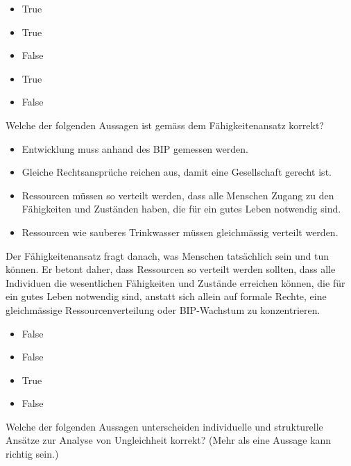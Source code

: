 \documentclass[
  nswissgerman,
  a4paper,
  DIV=11,
  numbers=noendperiod,
  oneside,
  openany]{scrreprt}
\providecommand{\tightlist}{%
  \setlength{\itemsep}{0pt}\setlength{\parskip}{0pt}}
\begin{document}
\begin{itemize}
\tightlist
\item
  True
\item
  True
\item
  False
\item
  True
\item
  False
\end{itemize}

Welche der folgenden Aussagen ist gemäss dem Fähigkeitenansatz korrekt?

\begin{itemize}
\tightlist
\item[$\square$]
  Entwicklung muss anhand des BIP gemessen werden.
\item[$\square$]
  Gleiche Rechtsansprüche reichen aus, damit eine Gesellschaft gerecht
  ist.
\item[$\square$]
  Ressourcen müssen so verteilt werden, dass alle Menschen Zugang zu den
  Fähigkeiten und Zuständen haben, die für ein gutes Leben notwendig
  sind.
\item[$\square$]
  Ressourcen wie sauberes Trinkwasser müssen gleichmässig verteilt
  werden.
\end{itemize}

Der Fähigkeitenansatz fragt danach, was Menschen tatsächlich sein und
tun können. Er betont daher, dass Ressourcen so verteilt werden sollten,
dass alle Individuen die wesentlichen Fähigkeiten und Zustände erreichen
können, die für ein gutes Leben notwendig sind, anstatt sich allein auf
formale Rechte, eine gleichmässige Ressourcenverteilung oder
BIP-Wachstum zu konzentrieren.

\begin{itemize}
\tightlist
\item
  False
\item
  False
\item
  True
\item
  False
\end{itemize}

Welche der folgenden Aussagen unterscheiden individuelle und
strukturelle Ansätze zur Analyse von Ungleichheit korrekt? (Mehr als
eine Aussage kann richtig sein.)
\end{document}
